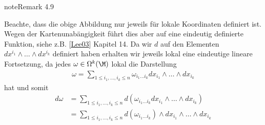 \documentclass[letterpaper,10pt,english]{jupyterBook}
\begin{document}
\begin{sphinxadmonition}{note}{Remark 4.9}



\sphinxAtStartPar
Beachte, dass die obige Abbildung nur jeweils für lokale Koordinaten definiert ist. Wegen der Kartenunabängigkeit führt dies aber auf eine eindeutig definierte Funktion, siehe z.B. {[}\hyperlink{cite.references:id15}{Lee03}{]} Kapitel 14. Da wir \(d\) auf den Elementen \(dx^{i_1}\wedge\ldots\wedge dx^{i_k}\) definiert haben erhalten wir jeweils lokal eine eindeutige lineare Fortsetzung, da jedes \(\omega\in \Omega^k(\M)\) lokal die Darstellung
\begin{equation*}
\begin{split}\omega = \sum_{1\leq i_1,\ldots,i_k \leq n}\omega_{i_1\ldots i_k}
dx_{i_1}\wedge\ldots\wedge dx_{i_k}\end{split}
\end{equation*}
\sphinxAtStartPar
hat und somit
\begin{equation*}
\begin{split}d\omega &= \sum_{1\leq i_1,\ldots,i_k \leq n} d(\omega_{i_1\ldots i_k}
dx_{i_1}\wedge\ldots\wedge dx_{i_k})\\ 
&= \sum_{1\leq i_1,\ldots,i_k \leq n} d(\omega_{i_1\ldots i_k})\wedge
dx_{i_1}\wedge\ldots\wedge dx_{i_k}\end{split}
\end{equation*}\end{sphinxadmonition}
\label{manifolds/diffformen:ex:10.14}
\end{document}

